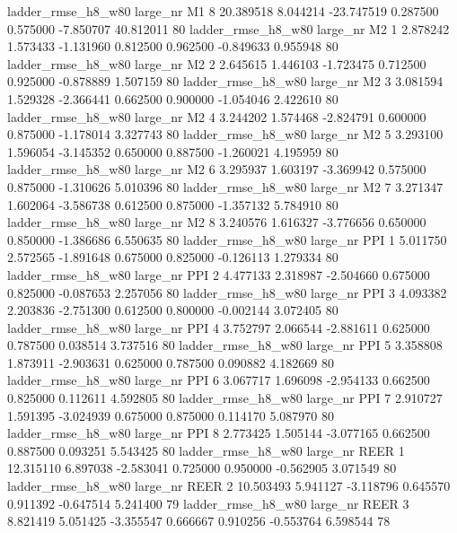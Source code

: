  ladder_rmse_h8_w80   large_nr       M1                 8 20.389518  8.044214 -23.747519 0.287500 0.575000 -7.850707   40.812011 80
 ladder_rmse_h8_w80   large_nr       M2                 1  2.878242  1.573433  -1.131960 0.812500 0.962500 -0.849633    0.955948 80
 ladder_rmse_h8_w80   large_nr       M2                 2  2.645615  1.446103  -1.723475 0.712500 0.925000 -0.878889    1.507159 80
 ladder_rmse_h8_w80   large_nr       M2                 3  3.081594  1.529328  -2.366441 0.662500 0.900000 -1.054046    2.422610 80
 ladder_rmse_h8_w80   large_nr       M2                 4  3.244202  1.574468  -2.824791 0.600000 0.875000 -1.178014    3.327743 80
 ladder_rmse_h8_w80   large_nr       M2                 5  3.293100  1.596054  -3.145352 0.650000 0.887500 -1.260021    4.195959 80
 ladder_rmse_h8_w80   large_nr       M2                 6  3.295937  1.603197  -3.369942 0.575000 0.875000 -1.310626    5.010396 80
 ladder_rmse_h8_w80   large_nr       M2                 7  3.271347  1.602064  -3.586738 0.612500 0.875000 -1.357132    5.784910 80
 ladder_rmse_h8_w80   large_nr       M2                 8  3.240576  1.616327  -3.776656 0.650000 0.850000 -1.386686    6.550635 80
 ladder_rmse_h8_w80   large_nr      PPI                 1  5.011750  2.572565  -1.891648 0.675000 0.825000 -0.126113    1.279334 80
 ladder_rmse_h8_w80   large_nr      PPI                 2  4.477133  2.318987  -2.504660 0.675000 0.825000 -0.087653    2.257056 80
 ladder_rmse_h8_w80   large_nr      PPI                 3  4.093382  2.203836  -2.751300 0.612500 0.800000 -0.002144    3.072405 80
 ladder_rmse_h8_w80   large_nr      PPI                 4  3.752797  2.066544  -2.881611 0.625000 0.787500  0.038514    3.737516 80
 ladder_rmse_h8_w80   large_nr      PPI                 5  3.358808  1.873911  -2.903631 0.625000 0.787500  0.090882    4.182669 80
 ladder_rmse_h8_w80   large_nr      PPI                 6  3.067717  1.696098  -2.954133 0.662500 0.825000  0.112611    4.592805 80
 ladder_rmse_h8_w80   large_nr      PPI                 7  2.910727  1.591395  -3.024939 0.675000 0.875000  0.114170    5.087970 80
 ladder_rmse_h8_w80   large_nr      PPI                 8  2.773425  1.505144  -3.077165 0.662500 0.887500  0.093251    5.543425 80
 ladder_rmse_h8_w80   large_nr     REER                 1 12.315110  6.897038  -2.583041 0.725000 0.950000 -0.562905    3.071549 80
 ladder_rmse_h8_w80   large_nr     REER                 2 10.503493  5.941127  -3.118796 0.645570 0.911392 -0.647514    5.241400 79
 ladder_rmse_h8_w80   large_nr     REER                 3  8.821419  5.051425  -3.355547 0.666667 0.910256 -0.553764    6.598544 78
